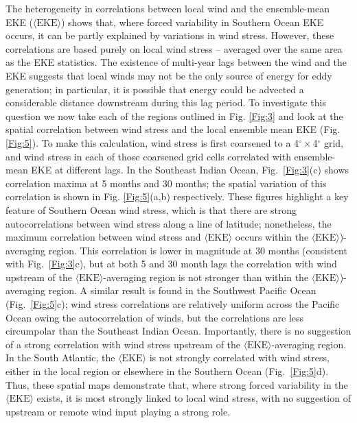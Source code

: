 \documentclass{agujournal2019}
\begin{document}
The heterogeneity in correlations between local wind and the ensemble-mean EKE ($\langle\textrm{EKE}\rangle$) shows that, where forced variability in Southern Ocean EKE occurs, it can be partly explained by variations in wind stress.
However, these correlations are based purely on local wind stress -- averaged over the same area as the EKE statistics.
The existence of multi-year lags between the wind and the EKE suggests that local winds may not be the only source of energy for eddy generation; in particular, it is possible that energy could be advected a considerable distance downstream during this lag period.
To investigate this question we now take each of the regions outlined in Fig. \ref{Fig:3} and look at the spatial correlation between wind stress and the local ensemble mean EKE (Fig. \ref{Fig:5}).
To make this calculation, wind stress is first coarsened to a 4$^\circ \times $4$^\circ$ grid, and wind stress in each of those coarsened grid cells correlated with ensemble-mean EKE at different lags.
In the Southeast Indian Ocean, Fig.~\ref{Fig:3}(c) shows correlation maxima at 5 months and 30 months; the spatial variation of this correlation is shown in Fig. \ref{Fig:5}(a,b) respectively.
These figures highlight a key feature of Southern Ocean wind stress, which is that there are strong autocorrelations between wind stress along a line of latitude; nonetheless, the maximum correlation between wind stress and $\langle\textrm{EKE}\rangle$ occurs within the $\langle\textrm{EKE}\rangle$)-averaging region.
This correlation is lower in magnitude at 30 months (consistent with Fig.~\ref{Fig:3}c), but at both 5 and 30 month lags the correlation with wind upstream of the $\langle\textrm{EKE}\rangle$-averaging region is not stronger than within the $\langle\textrm{EKE}\rangle$)-averaging region.
A similar result is found in the Southwest Pacific Ocean (Fig.~\ref{Fig:5}c); wind stress correlations are relatively uniform across the Pacific Ocean owing the autocorrelation of winds, but the correlations are less circumpolar than the Southeast Indian Ocean.
Importantly, there is no suggestion of a strong correlation with wind stress upstream of the $\langle\textrm{EKE}\rangle$-averaging region.
In the South Atlantic, the $\langle\textrm{EKE}\rangle$ is not strongly correlated with wind stress, either in the local region or elsewhere in the Southern Ocean (Fig.~\ref{Fig:5}d).
Thus, these spatial maps demonstrate that, where strong forced variability in the $\langle\textrm{EKE}\rangle$ exists, it is most strongly linked to local wind stress, with no suggestion of upstream or remote wind input playing a strong role. 
\end{document}
